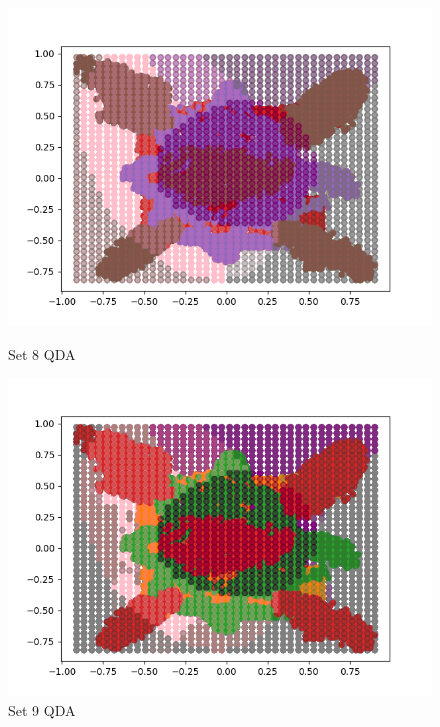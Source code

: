 \documentclass{article}
\begin{document}
\begin{figure}[H]
	\centering
	\begin{minipage}{.33\textwidth}
			\centering
			\includegraphics[width=1\linewidth]{../set8QDAdecisions.png}
			\caption{Set 8 QDA}
	\end{minipage}\hfill
        \centering
	\begin{minipage}{.33\textwidth}
			\centering
			\includegraphics[width=1\linewidth]{../set9QDAdecisions.png}
			\caption{Set 9 QDA}
	\end{minipage}\hfill
        \centering
	\begin{minipage}{.33\textwidth}
			\centering

\end{minipage}
\end{figure}
\end{document}
